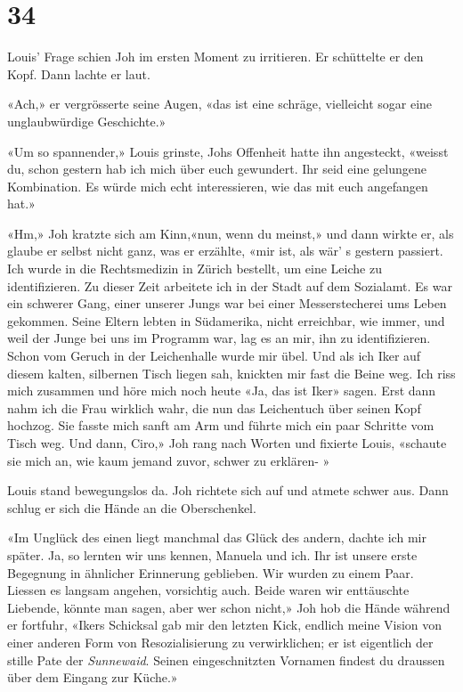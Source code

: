 \chapter{34}



Louis’ Frage schien Joh im ersten Moment zu irritieren. Er schüttelte er den Kopf. Dann lachte er laut.

«Ach,» er vergrösserte seine Augen, «das ist eine schräge, vielleicht sogar eine unglaubwürdige Geschichte.»

«Um so spannender,» Louis grinste, Johs Offenheit hatte ihn angesteckt, «weisst du, schon gestern hab ich mich über euch gewundert. Ihr seid eine gelungene Kombination. Es würde mich echt interessieren, wie das mit euch angefangen hat.»

«Hm,» Joh kratzte sich am Kinn,«nun, wenn du meinst,» und dann wirkte er, als glaube er selbst
nicht ganz, was er erzählte, «mir ist, als wär’ s gestern passiert. Ich wurde
in die Rechtsmedizin in Zürich bestellt, um eine Leiche zu
identifizieren. Zu dieser Zeit arbeitete ich in der Stadt auf dem
Sozialamt. Es war ein schwerer Gang, einer unserer Jungs war bei einer
Messerstecherei ums Leben gekommen. Seine Eltern lebten in Südamerika, 
nicht erreichbar, wie immer, und weil der Junge bei uns im
Programm war, lag es an mir, ihn zu identifizieren. Schon vom Geruch in
der Leichenhalle wurde mir übel. Und als ich Iker auf diesem kalten,
silbernen Tisch liegen sah, knickten mir fast die Beine weg. Ich riss
mich zusammen und höre mich noch heute «Ja, das ist Iker» sagen. Erst
dann nahm ich die Frau wirklich wahr, die nun das Leichentuch über
seinen Kopf hochzog. Sie fasste mich sanft am Arm und führte mich ein
paar Schritte vom Tisch weg. Und dann, Ciro,» Joh rang nach Worten und
fixierte Louis, «schaute sie mich an, wie kaum jemand zuvor, schwer
zu erklären- »

Louis stand bewegungslos da. Joh richtete sich auf und atmete schwer
aus. Dann schlug er sich die Hände an die Oberschenkel.

«Im Unglück des einen liegt manchmal das Glück des andern, dachte ich
mir später. Ja, so lernten wir uns kennen, Manuela und ich. Ihr ist
unsere erste Begegnung in ähnlicher Erinnerung geblieben. Wir wurden zu
einem Paar. Liessen es langsam angehen, vorsichtig auch. Beide waren wir
enttäuschte Liebende, könnte man sagen, aber wer schon nicht,» Joh hob
die Hände während er fortfuhr, «Ikers Schicksal gab mir den letzten
Kick, endlich meine Vision von einer anderen Form von Resozialisierung
zu verwirklichen; er ist eigentlich der stille Pate der
\emph{Sunnewaid}. Seinen eingeschnitzten Vornamen findest du draussen
über dem Eingang zur Küche.»

